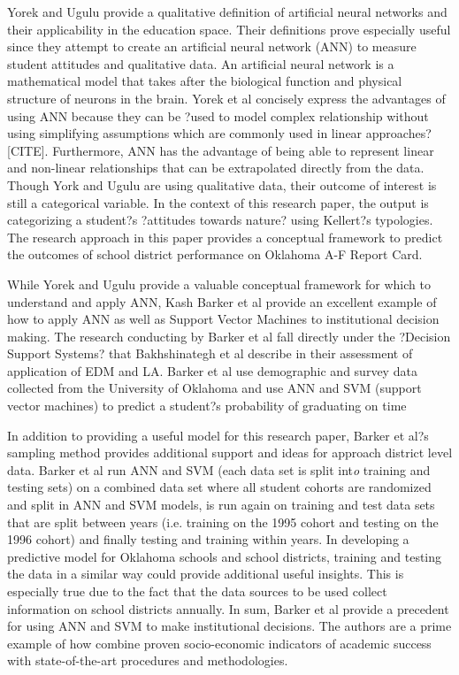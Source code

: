\documentclass[12pt,a4paper]{article}
\begin{document}
Yorek and Ugulu provide a qualitative definition of artificial neural networks and their applicability in the education space. Their definitions prove especially useful since they attempt to create an artificial neural network (ANN) to measure student attitudes and qualitative data. An artificial neural network is a mathematical model that takes after the biological function and physical structure of neurons in the brain. Yorek et al concisely express the advantages of using ANN because they can be ?used to model complex relationship without using simplifying assumptions which are commonly used in linear approaches? [CITE]. Furthermore, ANN has the advantage of being able to represent linear and non-linear relationships that can be extrapolated directly from the data. Though York and Ugulu are using qualitative data, their outcome of interest is still a categorical variable. In the context of this research paper, the output is categorizing a student?s ?attitudes towards nature? using Kellert?s typologies. The research approach in this paper provides a conceptual framework to predict the outcomes of school district performance on Oklahoma A-F Report Card. 

While Yorek and Ugulu provide a valuable conceptual framework for which to understand and apply ANN, Kash Barker et al provide an excellent example of how to apply ANN as well as Support Vector Machines to institutional decision making. The research conducting by Barker et al fall directly under the ?Decision Support Systems? that Bakhshinategh et al describe in their assessment of application of EDM and LA. Barker et al use demographic and survey data collected from the University of Oklahoma and use ANN and SVM (support vector machines) to predict a student?s probability of graduating on time \cite{1314666}

In addition to providing a useful model for this research paper, Barker et al?s sampling method provides additional support and ideas for approach district level data. Barker et al run ANN and SVM (each data set is split int\textsl{o} training and testing sets) on a combined data set where all student cohorts are randomized and split in ANN and SVM models, is run again on training and test data sets that are split between years (i.e. training on the 1995 cohort and testing on the 1996 cohort) and finally testing and training within years. In developing a predictive model for Oklahoma schools and school districts, training and testing the data in a similar way could provide additional useful insights. This is especially true due to the fact that the data sources to be used collect information on school districts annually. In sum, Barker et al provide a precedent for using ANN and SVM to make institutional decisions. The authors are a prime example of how combine proven socio-economic indicators of academic success with state-of-the-art procedures and methodologies.   

\newpage


\end{document}
